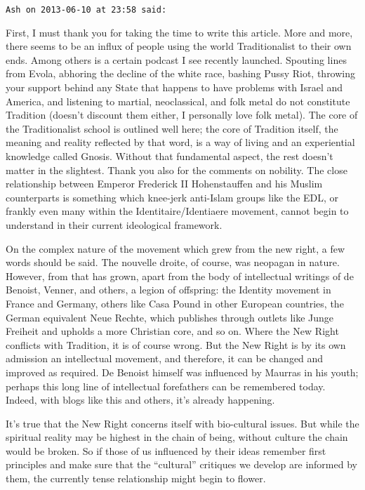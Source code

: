 \begin{footnotesize}
\begin{sffamily}
\texttt{Ash on 2013-06-10 at 23:58 said:}

First, I must thank you for taking the time to write this article. More and more, there seems to be an influx of people using the world Traditionalist to their own ends. Among others is a certain podcast I see recently launched. Spouting lines from Evola, abhoring the decline of the white race, bashing Pussy Riot, throwing your support behind any State that happens to have problems with Israel and America, and listening to martial, neoclassical, and folk metal do not constitute Tradition (doesn't discount them either, I personally love folk metal). The core of the Traditionalist school is outlined well here; the core of Tradition itself, the meaning and reality reflected by that word, is a way of living and an experiential knowledge called Gnosis. Without that fundamental aspect, the rest doesn't matter in the slightest. Thank you also for the comments on nobility. The close relationship between Emperor Frederick II Hohenstauffen and his Muslim counterparts is something which knee-jerk anti-Islam groups like the EDL, or frankly even many within the Identitaire/Identiaere movement, cannot begin to understand in their current ideological framework.

On the complex nature of the movement which grew from the new right, a few words should be said. The nouvelle droite, of course, was neopagan in nature. However, from that has grown, apart from the body of intellectual writings of de Benoist, Venner, and others, a legion of offspring: the Identity movement in France and Germany, others like Casa Pound in other European countries, the German equivalent Neue Rechte, which publishes through outlets like Junge Freiheit and upholds a more Christian core, and so on. Where the New Right conflicts with Tradition, it is of course wrong. But the New Right is by its own admission an intellectual movement, and therefore, it can be changed and improved as required. De Benoist himself was influenced by Maurras in his youth; perhaps this long line of intellectual forefathers can be remembered today. Indeed, with blogs like this and others, it's already happening.

It's true that the New Right concerns itself with bio-cultural issues. But while the spiritual reality may be highest in the chain of being, without culture the chain would be broken. So if those of us influenced by their ideas remember first principles and make sure that the ``cultural'' critiques we develop are informed by them, the currently tense relationship might begin to flower.


\end{sffamily}
\end{footnotesize}
